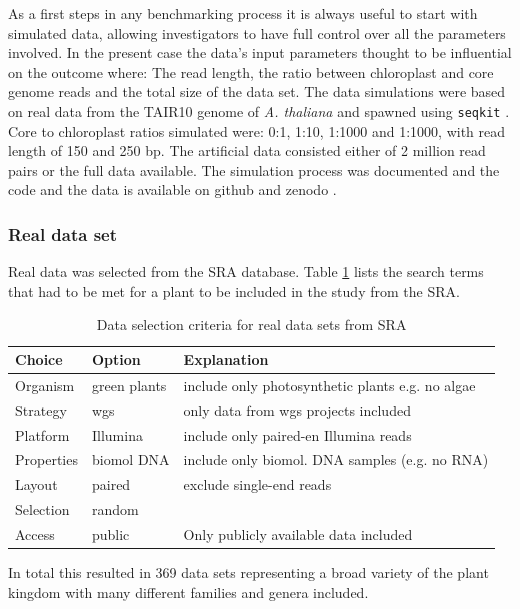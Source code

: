 As a first steps in any benchmarking process it is always useful to start with simulated data, allowing
investigators to have full control over all the parameters involved. In the present case the data's input
parameters thought to be influential on the outcome where: The read length, the ratio between chloroplast and
core genome reads and the total size of the data set. The data simulations were based on real data from the
TAIR10 genome of \textit{A. thaliana} \cite{tair10} and spawned using \texttt{seqkit} \cite{seqkit}. Core to
chloroplast ratios simulated were: 0:1, 1:10, 1:1000 and 1:1000, with read length of 150 and 250 bp. The
artificial data consisted either of 2 million read pairs or the full data available. The simulation
process was documented and the code and the data is available on github and zenodo \cite{zenododataset}.

\subsubsection{Real data set}\label{sec:cp_real}

Real data was selected from the SRA database. Table \ref{tab:sra_real} lists the search terms that had to be
met for a plant to be included in the study from the SRA.

\onehalfspacing
\begin{table}[H]
\caption{Data selection criteria for real data sets from SRA}
\label{tab:sra_real}
\centering
\begin{tabular}{lll}
  \hline
  Choice & Option & Explanation \\
  \hline
   Organism   & green plants &  include only photosynthetic plants e.g. no algae  \\
   Strategy   & wgs          & only data from wgs projects included \\
   Platform   & Illumina     & include only paired-en Illumina reads \\
   Properties & biomol DNA   & include only biomol. DNA samples (e.g. no RNA) \\
   Layout     & paired       & exclude single-end reads  \\
   Selection  & random       & \\
   Access     & public       & Only publicly available data included \\
  \hline                                         
\end{tabular}
\end{table}
\doublespacing
\noindent
In total this resulted in 369 data sets representing a broad variety of the plant kingdom with many different
families and genera included.

